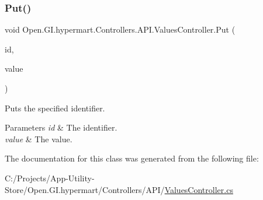 \subsubsection{\texorpdfstring{Put()}{Put()}}
{\footnotesize\ttfamily void Open.\+G\+I.\+hypermart.\+Controllers.\+A\+P\+I.\+Values\+Controller.\+Put (\begin{DoxyParamCaption}\item[{int}]{id,  }\item[{\mbox{[}\+From\+Body\mbox{]} string}]{value }\end{DoxyParamCaption})}



Puts the specified identifier. 


\begin{DoxyParams}{Parameters}
{\em id} & The identifier.\\
\hline
{\em value} & The value.\\
\hline
\end{DoxyParams}


The documentation for this class was generated from the following file\+:\begin{DoxyCompactItemize}
\item 
C\+:/\+Projects/\+App-\/\+Utility-\/\+Store/\+Open.\+G\+I.\+hypermart/\+Controllers/\+A\+P\+I/\hyperlink{_values_controller_8cs}{Values\+Controller.\+cs}\end{DoxyCompactItemize}
